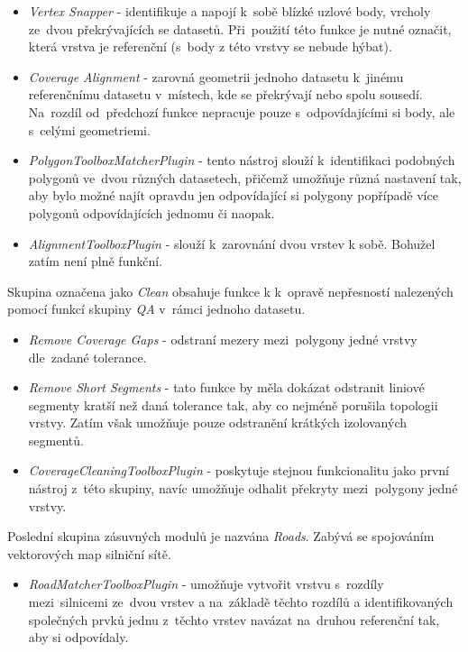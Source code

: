 \begin{itemize}
 \item \textit{Vertex Snapper} - identifikuje a napojí k~sobě blízké uzlové body, vrcholy ze~dvou překrývajících se datasetů. Při~použití této funkce je nutné označit, 
	která vrstva je referenční (s~body z této vrstvy se nebude hýbat).
 \item \textit{Coverage Alignment} - zarovná geometrii jednoho datasetu k~jinému referenčnímu datasetu v~místech, kde se překrývají nebo spolu sousedí. Na~rozdíl 
	od~předchozí funkce nepracuje pouze s~odpovídajícími si body, ale s~celými geometriemi.
 \item \textit{PolygonToolboxMatcherPlugin} - tento nástroj slouží k~identifikaci podobných polygonů ve~dvou různých datasetech, přičemž umožňuje různá nastavení tak, 
	aby bylo možné najít opravdu jen odpovídající si polygony popřípadě více polygonů odpovídajících jednomu či naopak. %
 \item \textit{AlignmentToolboxPlugin} - slouží k~zarovnání dvou vrstev k sobě. Bohužel zatím není plně funkční. %
\end{itemize}

Skupina označena jako \textit{Clean} obsahuje funkce k k~opravě nepřesností nalezených pomocí funkcí skupiny \textit{QA} v~rámci jednoho datasetu.

\begin{itemize}
 \item \textit{Remove Coverage Gaps} - odstraní mezery mezi~polygony jedné vrstvy dle~zadané tolerance.
 \item \textit{Remove Short Segments} - tato funkce by měla dokázat odstranit liniové segmenty kratší než daná tolerance tak, aby co nejméně porušila topologii vrstvy. 
      Zatím však umožňuje pouze odstranění krátkých izolovaných segmentů.
 \item \textit{CoverageCleaningToolboxPlugin} - poskytuje stejnou funkcionalitu jako první nástroj z~této skupiny, navíc umožňuje odhalit překryty mezi~polygony jedné vrstvy.
\end{itemize}

Poslední skupina zásuvných modulů je nazvána \textit{Roads}. Zabývá se spojováním vektorových map silniční sítě.

\begin{itemize}
 \item \textit{RoadMatcherToolboxPlugin} - umožňuje vytvořit vrstvu s~rozdíly mezi~silnicemi ze~dvou vrstev a na~základě těchto rozdílů a identifikovaných společných prvků 
	jednu z~těchto vrstev navázat na~druhou referenční tak, aby si odpovídaly.
\end{itemize}



